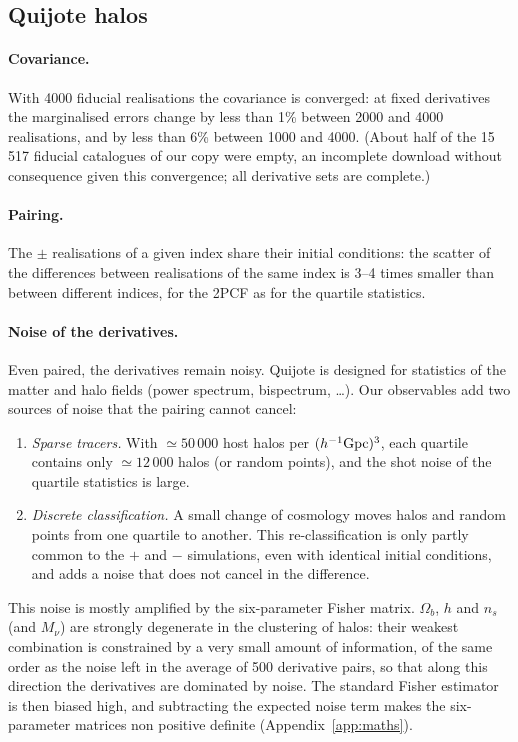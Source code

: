 \documentclass[11pt,twocolumn]{article}
\begin{document}
\subsection{Quijote halos}
\label{sec:quijote}

\paragraph{Covariance.} With 4000 fiducial realisations the covariance is converged: at fixed derivatives the marginalised errors change by less than 1\% between 2000 and 4000 realisations, and by less than 6\% between 1000 and 4000. (About half of the 15\,517 fiducial catalogues of our copy were empty, an incomplete download without consequence given this convergence; all derivative sets are complete.)

\paragraph{Pairing.} The $\pm$ realisations of a given index share their initial conditions: the scatter of the differences between realisations of the same index is 3--4 times smaller than between different indices, for the 2PCF as for the quartile statistics.

\paragraph{Noise of the derivatives.} Even paired, the derivatives remain noisy. Quijote is designed for statistics of the matter and halo fields (power spectrum, bispectrum, \dots). Our observables add two sources of noise that the pairing cannot cancel:
\begin{enumerate}
\item \emph{Sparse tracers.} With $\simeq50\,000$ host halos per $(h^{-1}{\rm Gpc})^3$, each quartile contains only $\simeq12\,000$ halos (or random points), and the shot noise of the quartile statistics is large.
\item \emph{Discrete classification.} A small change of cosmology moves halos and random points from one quartile to another. This re-classification is only partly common to the $+$ and $-$ simulations, even with identical initial conditions, and adds a noise that does not cancel in the difference.
\end{enumerate}
This noise is mostly amplified by the six-parameter Fisher matrix. $\Omega_b$, $h$ and $n_s$ (and $M_\nu$) are strongly degenerate in the clustering of halos: their weakest combination is constrained by a very small amount of information, of the same order as the noise left in the average of 500 derivative pairs, so that along this direction the derivatives are dominated by noise. The standard Fisher estimator is then biased high, and subtracting the expected noise term makes the six-parameter matrices non positive definite (Appendix~\ref{app:maths}).
\end{document}
